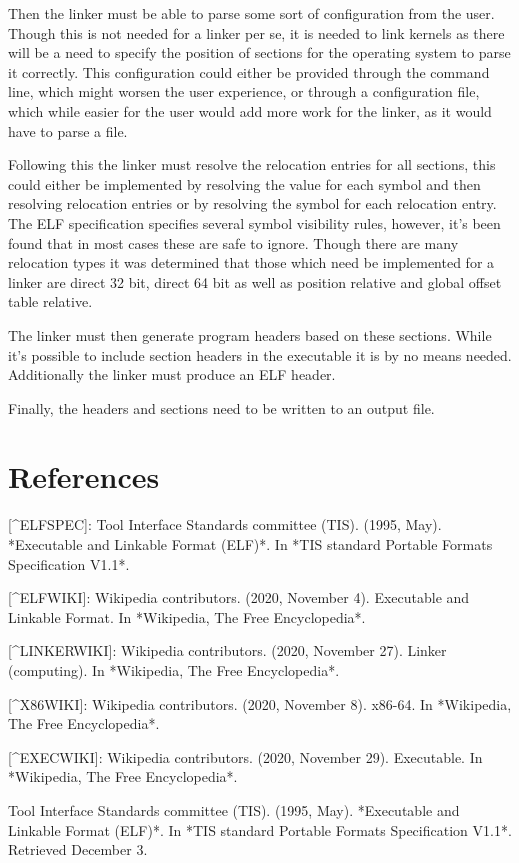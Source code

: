 \documentclass[notitlepage]{report}
\begin{document}
Then the linker must be able to parse some sort of configuration from the user. Though this is not needed for a linker per se, it is needed to link kernels as there will be a need to specify the position of sections for the operating system to parse it correctly. This configuration could either be provided through the command line, which might worsen the user experience, or through a configuration file, which while easier for the user would add more work for the linker, as it would have to parse a file.

Following this the linker must resolve the relocation entries for all sections, this could either be implemented by resolving the value for each symbol and then resolving relocation entries or by resolving the symbol for each relocation entry. The ELF specification specifies several symbol visibility rules, however, it's been found that in most cases these are safe to ignore. Though there are many relocation types it was determined that those which need be implemented for a linker are direct 32 bit, direct 64 bit as well as position relative and global offset table relative.

The linker must then generate program headers based on these sections. While it's possible to include section headers in the executable it is by no means needed. Additionally the linker must produce an ELF header.

Finally, the headers and sections need to be written to an output file.

\section{References}

[^ELFSPEC]: Tool Interface Standards committee (TIS). (1995, May). *Executable and Linkable Format (ELF)*. In *TIS standard Portable Formats Specification V1.1*.

[^ELFWIKI]: Wikipedia contributors. (2020, November 4). Executable and Linkable Format. In *Wikipedia, The Free Encyclopedia*.

[^LINKERWIKI]: Wikipedia contributors. (2020, November 27). Linker (computing). In *Wikipedia, The Free Encyclopedia*.

[^X86WIKI]: Wikipedia contributors. (2020, November 8). x86-64. In *Wikipedia, The Free Encyclopedia*.

[^EXECWIKI]: Wikipedia contributors. (2020, November 29). Executable. In *Wikipedia, The Free Encyclopedia*.

Tool Interface Standards committee (TIS). (1995, May). *Executable and Linkable Format (ELF)*. In *TIS standard Portable Formats Specification V1.1*.
Retrieved December 3.
\end{document}
